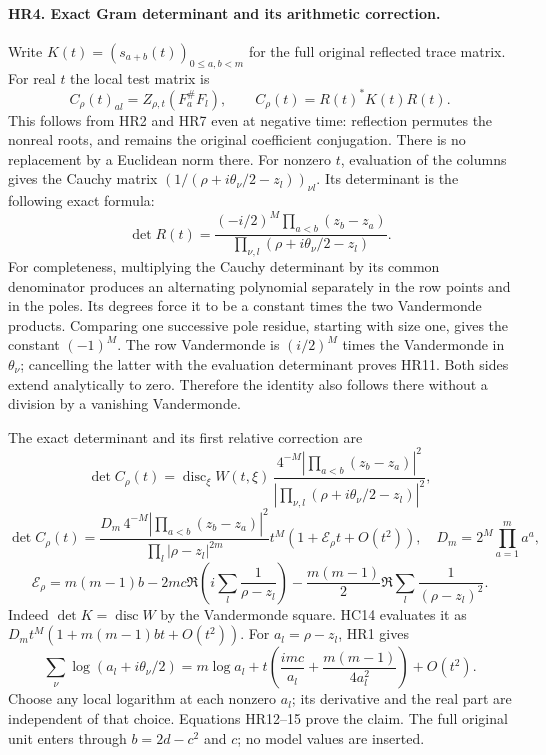 \documentclass[11pt,a4paper]{article}
\theoremstyle{definition}\newtheorem{definition}[theorem]{Definition}
\begin{document}
\paragraph{HR4. Exact Gram determinant and its arithmetic correction.}
Write $K(t)=(s_{a+b}(t))_{0\le a,b<m}$ for the full original
reflected trace matrix. For real $t$ the local test matrix is
\[
 C_\rho(t)_{al}=Z_{\rho,t}(F_a^\#F_l),\qquad
 C_\rho(t)=R(t)^*K(t)R(t).
 \tag{HR10}
\]
This follows from HR2 and HR7 even at negative time: reflection
permutes the nonreal roots, and remains the original coefficient
conjugation. There is no replacement by a Euclidean norm there.
For nonzero $t$, evaluation of the columns gives the Cauchy matrix
$(1/(\rho+i\theta_\nu/2-z_l))_{\nu l}$. Its determinant is
the following exact formula:
\[
 \det R(t)=
 \frac{(-i/2)^M\prod_{a<b}(z_b-z_a)}
      {\prod_{\nu,l}(\rho+i\theta_\nu/2-z_l)}.
 \tag{HR11}
\]
For completeness, multiplying the Cauchy determinant by its common
denominator produces an alternating polynomial separately in
the row points and in the poles. Its degrees force it to be a
constant times the two Vandermonde products. Comparing one
successive pole residue, starting with size one, gives the
constant $(-1)^M$. The row Vandermonde is $(i/2)^M$ times
the Vandermonde in $\theta_\nu$; cancelling the latter with the
evaluation determinant proves HR11. Both sides extend analytically
to zero. Therefore the identity also follows there without a
division by a vanishing Vandermonde.

The exact determinant and its first relative correction are
\[
 \det C_\rho(t)=\operatorname{disc}_\xi W(t,\xi)\,
 \frac{4^{-M}|\prod_{a<b}(z_b-z_a)|^2}
      {|\prod_{\nu,l}(\rho+i\theta_\nu/2-z_l)|^2},
 \tag{HR12}
\]
\[
 \det C_\rho(t)=
 \frac{D_m\,4^{-M}|\prod_{a<b}(z_b-z_a)|^2}
      {\prod_l|\rho-z_l|^{2m}}
 t^M\left(1+\mathcal E_\rho t+O(t^2)\right),
 \quad D_m=2^M\prod_{a=1}^m a^a,
 \tag{HR13}
\]
\[
 \mathcal E_\rho=m(m-1)b
 -2mc\Re\left(i\sum_l\frac1{\rho-z_l}\right)
 -\frac{m(m-1)}2\Re\sum_l\frac1{(\rho-z_l)^2}.
 \tag{HR14}
\]
Indeed $\det K=\operatorname{disc}W$ by the Vandermonde square.
HC14 evaluates it as $D_mt^M(1+m(m-1)bt+O(t^2))$.
For $a_l=\rho-z_l$, HR1 gives
\[
 \sum_\nu\log(a_l+i\theta_\nu/2)
 =m\log a_l+t\left(\frac{imc}{a_l}
                  +\frac{m(m-1)}{4a_l^2}\right)+O(t^2).
 \tag{HR15}
\]
Choose any local logarithm at each nonzero $a_l$; its derivative
and the real part are independent of that choice. Equations
HR12--15 prove the claim. The full original unit enters through
$b=2d-c^2$ and $c$; no model values are inserted.
\end{document}
